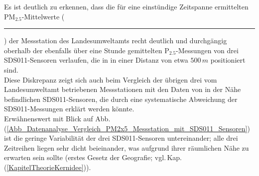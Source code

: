 Es ist deutlich zu erkennen, dass die für eine einstündige Zeitspanne 
ermittelten $\mathrm{PM}_{2.5}$-Mittelwerte 
(\textcolor{orange}{\rule[1mm]{3mm}{0.5mm}})
der Messstation des Landesumweltamts recht deutlich und durchgängig 
oberhalb der ebenfalls über eine Stunde gemittelten 
$\mathrm{P}_{2.5}$-Messungen von drei SDS011-Sensoren verlaufen, die in in einer Distanz von 
 etwa $500\,m$ positioniert sind. \\
  Diese Diskrepanz zeigt sich auch beim Vergleich der übrigen drei vom
 Landesumweltamt betriebenen Messstationen mit den Daten von in der Nähe
 befindlichen SDS011-Sensoren, die durch eine systematische Abweichung der 
 SDS011-Messungen erklärt werden könnte. \\
Erwähnenswert mit Blick auf 
Abb.\,(\ref{Abb_Datenanalyse_Vergleich_PM2x5_Messstation_mit_SDS011_Sensoren}) 
ist die geringe Variabilität der drei SDS011-Sensoren untereinander; alle drei
Zeitreihen liegen sehr dicht beieinander, was aufgrund ihrer räumlichen 
Nähe zu erwarten sein sollte (erstes Gesetz der Geografie; vgl.\,Kap.\,(\ref{KapitelTheorieKernidee})).


